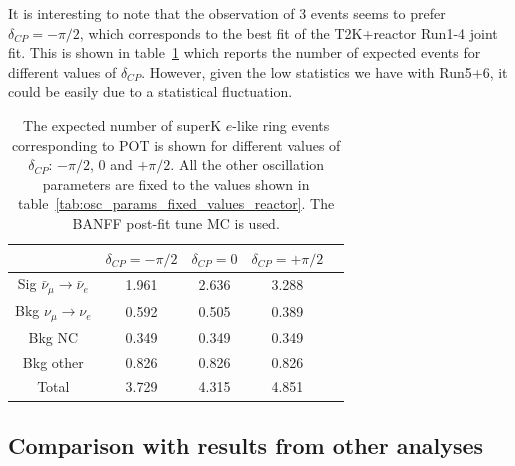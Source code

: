 It is interesting to note that the observation of 3 events seems to prefer $\delta_{CP} = - \pi / 2$, which corresponds to the best fit of the T2K+reactor Run1-4 joint fit. 
This is shown in table~\ref{tab:events_dcp} which reports the number of expected events for different values of $\delta_{CP}$.
However, given the low statistics we have with Run5+6, it could be easily due to a statistical fluctuation.

%
%
\begin{table}[htb]
\centering
\begin{tabular}{| c | c | c | c | c |}
\hline
		 						& $\delta_{CP} = - \pi / 2$	  	& $\delta_{CP} = 0$ 		& $\delta_{CP} = + \pi / 2$	\\
\hline
\hline
Sig $\bar{\nu}_{\mu} \to \bar{\nu}_{e}$	& 1.961					& 2.636				& 3.288				\\
\hline
\hline
Bkg $\nu_{\mu} \to \nu_{e}$			& 0.592					& 0.505				& 0.389				\\
\hline
Bkg NC							& 0.349					& 0.349				& 0.349				\\
\hline
Bkg other							& 0.826					& 0.826				& 0.826				\\
\hline
\hline
Total								& 3.729					& 4.315				& 4.851				\\
\hline
\end{tabular}
\caption{
The expected number of superK $e$-like ring events corresponding to \TotalPot POT
is shown for different values of $\delta_{CP}$: $- \pi / 2$, 0 and $+ \pi / 2$.
All the other oscillation parameters are fixed to the values shown in table~\ref{tab:osc_params_fixed_values_reactor}.
The BANFF post-fit tune MC is used.
}
\label{tab:events_dcp}
\end{table}




\subsection {Comparison with results from other analyses}
\label{sec:results_other_analyses}

